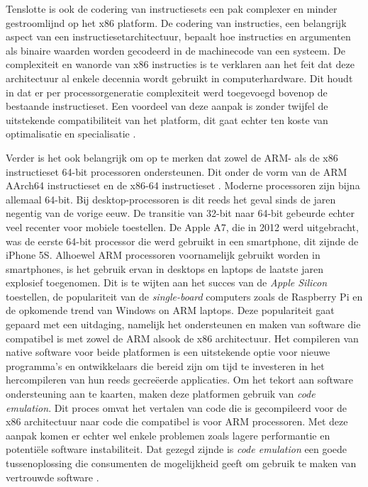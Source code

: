 Tenslotte is ook de codering van instructiesets een pak complexer en minder gestroomlijnd op het x86 platform. De codering van instructies, een belangrijk aspect van een instructiesetarchitectuur, bepaalt hoe instructies en argumenten als binaire waarden worden gecodeerd in de machinecode van een systeem. De complexiteit en wanorde van x86 instructies is te verklaren aan het feit dat deze architectuur al enkele decennia wordt gebruikt in computerhardware. Dit houdt in dat er per processorgeneratie complexiteit werd toegevoegd bovenop de bestaande instructieset. Een voordeel van deze aanpak is zonder twijfel de uitstekende compatibiliteit van het platform, dit gaat echter ten koste van optimalisatie en specialisatie \autocite{SarahHarris2015}.

Verder is het ook belangrijk om op te merken dat zowel de ARM- als de x86 instructieset 64-bit processoren ondersteunen. Dit onder de vorm van de ARM AArch64 instructieset en de x86-64 instructieset \autocite{ARM2022a}. Moderne processoren zijn bijna allemaal 64-bit. Bij desktop-processoren is dit reeds het geval sinds de jaren negentig van de vorige eeuw. De transitie van 32-bit naar 64-bit gebeurde echter veel recenter voor mobiele toestellen. De Apple A7, die in 2012 werd uitgebracht, was de eerste 64-bit processor die werd gebruikt in een smartphone, dit zijnde de iPhone 5S. Alhoewel ARM processoren voornamelijk gebruikt worden in smartphones, is het gebruik ervan in desktops en laptops de laatste jaren explosief toegenomen. Dit is te wijten aan het succes van de \textit{Apple Silicon} toestellen, de populariteit van de \textit{single-board} computers zoals de Raspberry Pi en de opkomende trend van Windows on ARM laptops. Deze populariteit gaat gepaard met een uitdaging, namelijk het ondersteunen en maken van software die compatibel is met zowel de ARM alsook de x86 architectuur. Het compileren van native software voor beide platformen is een uitstekende optie voor nieuwe programma’s en ontwikkelaars die bereid zijn om tijd te investeren in het hercompileren van hun reeds gecreëerde applicaties. Om het tekort aan software ondersteuning aan te kaarten, maken deze platformen gebruik van \textit{code emulation}. Dit proces omvat het vertalen van code die is gecompileerd voor de x86 architectuur naar code die compatibel is voor ARM processoren. Met deze aanpak komen er echter wel enkele problemen zoals lagere performantie en potentiële software instabiliteit. Dat gezegd zijnde is \textit{code emulation} een goede tussenoplossing die consumenten de mogelijkheid geeft om gebruik te maken van vertrouwde software \autocite{Triggs2022a}.

